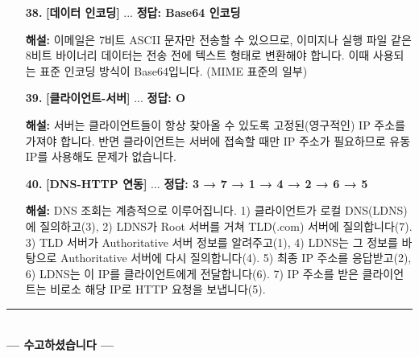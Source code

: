 \documentclass[a4paper, 10pt]{article}
\begin{document}
\begin{enumerate}[itemsep=2.5em, leftmargin=2em, label={}]
\item[\textbf{38.}] \textbf{[데이터 인코딩]} ...
\vspace{0.5em}
\noindent\textbf{정답: Base64 인코딩} \par
\small\textbf{해설:} 이메일은 7비트 ASCII 문자만 전송할 수 있으므로, 이미지나 실행 파일 같은 8비트 바이너리 데이터는 전송 전에 텍스트 형태로 변환해야 합니다. 이때 사용되는 표준 인코딩 방식이 Base64입니다. (MIME 표준의 일부)

\item[\textbf{39.}] \textbf{[클라이언트-서버]} ...
\vspace{0.5em}
\noindent\textbf{정답: O} \par
\small\textbf{해설:} 서버는 클라이언트들이 항상 찾아올 수 있도록 고정된(영구적인) IP 주소를 가져야 합니다. 반면 클라이언트는 서버에 접속할 때만 IP 주소가 필요하므로 유동 IP를 사용해도 문제가 없습니다.

\item[\textbf{40.}] \textbf{[DNS-HTTP 연동]} ...
\vspace{0.5em}
\noindent\textbf{정답: 3 → 7 → 1 → 4 → 2 → 6 → 5} \par
\small\textbf{해설:} DNS 조회는 계층적으로 이루어집니다. 1) 클라이언트가 로컬 DNS(LDNS)에 질의하고(3), 2) LDNS가 Root 서버를 거쳐 TLD(.com) 서버에 질의합니다(7). 3) TLD 서버가 Authoritative 서버 정보를 알려주고(1), 4) LDNS는 그 정보를 바탕으로 Authoritative 서버에 다시 질의합니다(4). 5) 최종 IP 주소를 응답받고(2), 6) LDNS는 이 IP를 클라이언트에게 전달합니다(6). 7) IP 주소를 받은 클라이언트는 비로소 해당 IP로 HTTP 요청을 보냅니다(5).

\end{enumerate}

\vfill
\begin{center}
  \rule{0.9\textwidth}{0.4pt}\\[8pt]
  {\small\textbf{--- 수고하셨습니다 ---}}\\[6pt]
\end{center}
\end{document}
